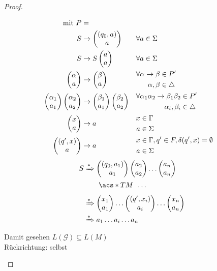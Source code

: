 \begin{proof}
\begin{itemize}
\begin{itemize}
	\end{itemize}
	\begin{align*}
		\text{mit } P &= \\
		S &\-> \pmqty{(q_0,a)\\a} &&\forall a\in\Sigma\\
		S &\-> S\pmqty{a\\a} &&\forall a\in\Sigma\\
		\pmqty{\alpha\\a}
			&\-> \pmqty{\beta\\a}
			&&\begin{aligned}
				\forall \alpha\->\beta &\in P'\\
				\alpha,\beta &\in\triangle
			\end{aligned}\\
		\pmqty{\alpha_1\\a_1}\pmqty{\alpha_2\\a_2}
			&\-> \pmqty{\beta_1\\a_1}\pmqty{\beta_2\\a_2}
			&&\begin{aligned}
				\forall \alpha_1\alpha_2\->\beta_1\beta_2 &\in P'\\
				\alpha_i,\beta_i &\in\triangle
			\end{aligned}\\
		\pmqty{x\\a} &\-> a
			&&\begin{aligned}
				x&\in\Gamma\\
				a&\in\Sigma
			\end{aligned}\\
		\pmqty{(q',x)\\a} &\-> a
			&&\begin{aligned}
				x&\in\Gamma, q'\in F, \delta (q',x)=\emptyset\\
				a&\in\Sigma
			\end{aligned}
	\end{align*}
	\begin{align*}
		S &\xRightarrow{*} \pmqty{(q_0,a_1)\\a_1}\pmqty{a_2\\a_2}\dots\pmqty{a_n\\a_n}\\
		&\phantom{{}\xRightarrow{*}{}}\ \acs*{TM}\ \,\dots\\
		&\xRightarrow{*} \pmqty{x_1\\a_1}\dots\pmqty{(q',x_i)\\a_i}\dots\pmqty{x_n\\a_n}\\
		&\xRightarrow{*} a_1\dots a_i\dots a_n
	\end{align*}
	Damit gesehen $L(\mathcal{G})\subseteq L(M)$\\
	Rückrichtung: selbst \qedhere
	\end{itemize}
\end{proof}

